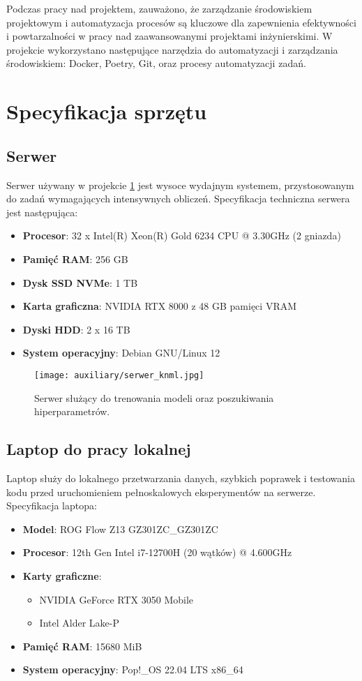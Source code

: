 \documentclass[12pt,twoside]{article}
\begin{document}
Podczas pracy nad projektem, zauważono, że zarządzanie środowiskiem projektowym i automatyzacja procesów są kluczowe dla zapewnienia efektywności i powtarzalności w pracy nad zaawansowanymi projektami inżynierskimi. W projekcie wykorzystano następujące narzędzia do automatyzacji i zarządzania środowiskiem: Docker, Poetry, Git, oraz procesy automatyzacji zadań.

\section{Specyfikacja sprzętu}

\subsection{Serwer}
Serwer używany w projekcie \ref{fig:serwer_knml} jest wysoce wydajnym systemem, przystosowanym do zadań wymagających intensywnych obliczeń. Specyfikacja techniczna serwera jest następująca:
\begin{itemize}
	\item \textbf{Procesor}: 32 x Intel(R) Xeon(R) Gold 6234 CPU @ 3.30GHz (2 gniazda)
	\item \textbf{Pamięć RAM}: 256 GB
	\item \textbf{Dysk SSD NVMe}: 1 TB
	\item \textbf{Karta graficzna}: NVIDIA RTX 8000 z 48 GB pamięci VRAM
	\item \textbf{Dyski HDD}: 2 x 16 TB
	\item \textbf{System operacyjny}: Debian GNU/Linux 12
\end{itemize}

\begin{figure}[ht]
	\centering
	\texttt{[image: auxiliary/serwer\_knml.jpg]}
	\caption{Serwer służący do trenowania modeli oraz poszukiwania hiperparametrów.}
	\label{fig:serwer_knml}
\end{figure}

\subsection{Laptop do pracy lokalnej}
Laptop służy do lokalnego przetwarzania danych, szybkich poprawek i testowania kodu przed uruchomieniem pełnoskalowych eksperymentów na serwerze. Specyfikacja laptopa:
\begin{itemize}
	\item \textbf{Model}: ROG Flow Z13 GZ301ZC\_GZ301ZC
	\item \textbf{Procesor}: 12th Gen Intel i7-12700H (20 wątków) @ 4.600GHz
	\item \textbf{Karty graficzne}:
	      \begin{itemize}
		      \item NVIDIA GeForce RTX 3050 Mobile
		      \item Intel Alder Lake-P
	      \end{itemize}
	\item \textbf{Pamięć RAM}: 15680 MiB
	\item \textbf{System operacyjny}: Pop!\_OS 22.04 LTS x86\_64
\end{itemize}
\end{document}

